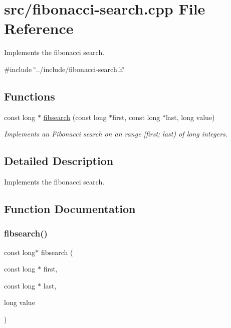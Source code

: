 \hypertarget{fibonacci-search_8cpp}{}\section{src/fibonacci-\/search.cpp File Reference}
\label{fibonacci-search_8cpp}


Implements the fibonacci search.  


{\ttfamily \#include \char`\"{}../include/fibonacci-\/search.\+h\char`\"{}}\newline
\subsection*{Functions}
\begin{DoxyCompactItemize}
\item 
const long $\ast$ \mbox{\hyperlink{fibonacci-search_8cpp_aca1f23be8dba691c46dcacb5df55ccea}{fibsearch}} (const long $\ast$first, const long $\ast$last, long value)
\begin{DoxyCompactList}\small\item\em Implements an Fibonacci search on an range \mbox{[}first; last) of long integers. \end{DoxyCompactList}\end{DoxyCompactItemize}


\subsection{Detailed Description}
Implements the fibonacci search. 



\subsection{Function Documentation}
\mbox{\label{fibonacci-search_8cpp_aca1f23be8dba691c46dcacb5df55ccea}} 
\subsubsection{\texorpdfstring{fibsearch()}{fibsearch()}}
{\footnotesize\ttfamily const long$\ast$ fibsearch (\begin{DoxyParamCaption}\item[{const long $\ast$}]{first,  }\item[{const long $\ast$}]{last,  }\item[{long}]{value }\end{DoxyParamCaption})}



